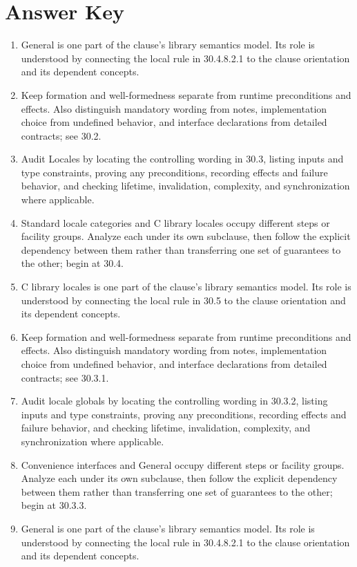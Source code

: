 \documentclass[11pt,letterpaper]{article}
\begin{document}
\clearpage\section{Answer Key}
\begin{enumerate}
\item General is one part of the clause's library semantics model. Its role is understood by connecting the local rule in 30.4.8.2.1 to the clause orientation and its dependent concepts.
\item Keep formation and well-formedness separate from runtime preconditions and effects. Also distinguish mandatory wording from notes, implementation choice from undefined behavior, and interface declarations from detailed contracts; see 30.2.
\item Audit Locales by locating the controlling wording in 30.3, listing inputs and type constraints, proving any preconditions, recording effects and failure behavior, and checking lifetime, invalidation, complexity, and synchronization where applicable.
\item Standard locale categories and C library locales occupy different steps or facility groups. Analyze each under its own subclause, then follow the explicit dependency between them rather than transferring one set of guarantees to the other; begin at 30.4.
\item C library locales is one part of the clause's library semantics model. Its role is understood by connecting the local rule in 30.5 to the clause orientation and its dependent concepts.
\item Keep formation and well-formedness separate from runtime preconditions and effects. Also distinguish mandatory wording from notes, implementation choice from undefined behavior, and interface declarations from detailed contracts; see 30.3.1.
\item Audit locale globals by locating the controlling wording in 30.3.2, listing inputs and type constraints, proving any preconditions, recording effects and failure behavior, and checking lifetime, invalidation, complexity, and synchronization where applicable.
\item Convenience interfaces and General occupy different steps or facility groups. Analyze each under its own subclause, then follow the explicit dependency between them rather than transferring one set of guarantees to the other; begin at 30.3.3.
\item General is one part of the clause's library semantics model. Its role is understood by connecting the local rule in 30.4.8.2.1 to the clause orientation and its dependent concepts.

\end{enumerate}
\end{document}
